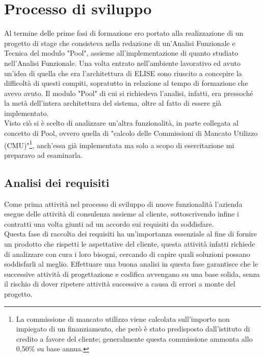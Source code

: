 \section{Processo di sviluppo}
Al termine delle prime fasi di formazione ero portato alla realizzazione di un progetto di stage che consisteva nella redazione di un'Analisi Funzionale e Tecnica del modulo "Pool", assieme all'implementazione di quanto studiato nell'Analisi Funzionale. Una volta entrato nell'ambiente lavorativo ed avuto un'idea di quella che era l'architettura di ELISE sono riuscito a concepire la difficoltà di questi compiti, sopratutto in relazione al tempo di formazione che avevo avuto. Il modulo "Pool" di cui si richiedeva l'analisi, infatti, era pressoché la metà dell'intera architettura del sistema, oltre al fatto di essere già implementato.\\

Visto ciò si è scelto di analizzare un'altra funzionalità, in parte collegata al concetto di Pool, ovvero quella di "calcolo delle Commissioni di Mancato Utilizzo (CMU)"\footnote{La commissione di mancato utilizzo viene calcolata sull'importo non impiegato di un finanziamento, che però è stato predisposto dall'istituto di credito a favore del cliente; generalmente questa commissione ammonta allo 0,50\% su base annua.}, anch'essa già implementata ma solo a scopo di esercitazione mi preparavo ad esaminarla.

\subsection{Analisi dei requisiti}

	Come prima attività nel processo di sviluppo di nuove funzionalità l'azienda esegue delle attività di consulenza assieme al cliente, sottoscrivendo infine i contratti una volta giunti ad un accordo sui requisiti da soddisfare.\\
	
	Questa fase di raccolta dei requisiti ha un'importanza essenziale al fine di fornire un prodotto che rispetti le aspettative del cliente, questa attività infatti richiede di analizzare con cura i loro bisogni, cercando di capire quali soluzioni possano soddisfarli al meglio. Effettuare una buona analisi in questa fase garantisce che le successive attività di progettazione e codifica avvengano su una base solida, senza il rischio di dover ripetere attività successive a causa di errori a monte del progetto.\\
	
